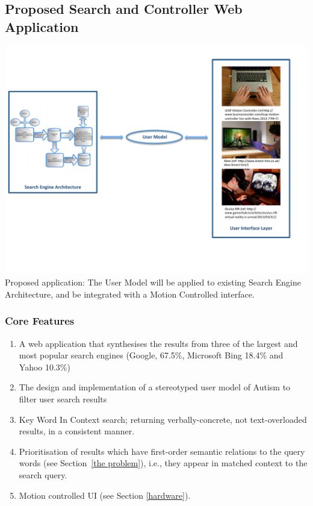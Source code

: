 \documentclass[a4paper, 11pt]{article}
\begin{document}
\subsection{Proposed Search and Controller Web Application}\label{proposed}
\begin{center}
\includegraphics[scale=0.7]{searchEngArchi}
Proposed application: The User Model will be applied to existing Search Engine Architecture\cite{seimage}, and be integrated with a Motion Controlled interface.
\end{center}


\subsubsection{Core Features}
\begin{enumerate}
\item  A web application that synthesises the results from three of the largest and most popular search engines (Google, 67.5\%, Microsoft Bing 18.4\% and Yahoo 10.3\%) \cite{adam}

\item The design and implementation of a stereotyped user model of Autism to filter user search results

\item Key Word In Context search; returning verbally-concrete, not text-overloaded results, in a consistent manner. 

\item Prioritisation of results which have first-order semantic relations to the query words (see Section~\ref{the problem}), i.e., they appear in matched context to the search query.

\item Motion controlled UI (see Section \ref{hardware}).
\end{enumerate}
\end{document}

